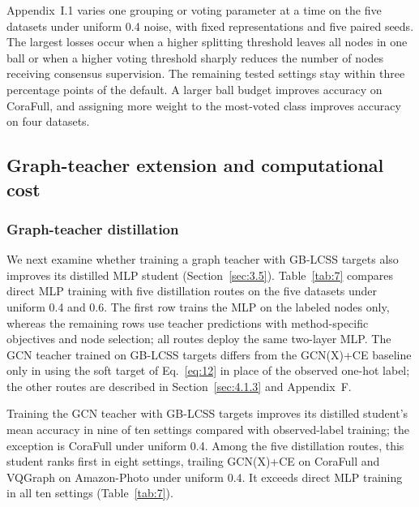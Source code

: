 \documentclass[times,review,10pt]{elsarticle}
\theoremstyle{definition}
\theoremstyle{plain}
\begin{document}
Appendix~I.1 varies one grouping or voting parameter at a time on the five datasets under uniform 0.4 noise, with fixed representations and five paired seeds. The largest losses occur when a higher splitting threshold leaves all nodes in one ball or when a higher voting threshold sharply reduces the number of nodes receiving consensus supervision. The remaining tested settings stay within three percentage points of the default. A larger ball budget improves accuracy on CoraFull, and assigning more weight to the most-voted class improves accuracy on four datasets.

\subsection{Graph-teacher extension and computational cost}\label{sec:4.4}

\subsubsection{Graph-teacher distillation}\label{sec:4.4.1}

We next examine whether training a graph teacher with GB-LCSS targets also improves its distilled MLP student (Section~\ref{sec:3.5}). Table~\ref{tab:7} compares direct MLP training with five distillation routes on the five datasets under uniform 0.4 and 0.6. The first row trains the MLP on the labeled nodes only, whereas the remaining rows use teacher predictions with method-specific objectives and node selection; all routes deploy the same two-layer MLP. The GCN teacher trained on GB-LCSS targets differs from the GCN(X)+CE baseline only in using the soft target of Eq.~\eqref{eq:12} in place of the observed one-hot label; the other routes are described in Section~\ref{sec:4.1.3} and Appendix~F.

\begin{table}[!t]
\centering
\caption{Test accuracy of deployed MLPs under direct training and graph-to-MLP distillation.}\label{tab:7}

\end{table}

Training the GCN teacher with GB-LCSS targets improves its distilled student's mean accuracy in nine of ten settings compared with observed-label training; the exception is CoraFull under uniform 0.4. Among the five distillation routes, this student ranks first in eight settings, trailing GCN(X)+CE on CoraFull and VQGraph on Amazon-Photo under uniform 0.4. It exceeds direct MLP training in all ten settings (Table~\ref{tab:7}).
\end{document}
